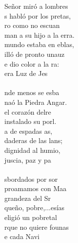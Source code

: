 \documentclass[12pt]{article}
\begin{document}
\begin{multicols*}{2}
\begin{cancion}%
	 Señor miró a lombres\\
	s habló por los pretas,\\
	ro como no escuan\\
	man a su hijo a la erra. \\
	 mundo estaba en eblas,\\
	illó de pronto unauz\\
	e dio color a la ra:\\
	era  Luz de Jes\\
	    \\
	nde menos se esba\\
	naó la Piedra Angar.\\
	 el corazón delre\\
	 instalado su porl.\\
	a de espadas as,\\
	daderas de las lans;\\
	 dignidad al humio,\\
	juscia, paz y pa\\
	   \\
	sbordados por sor\\
	proamamos con Maa \\
	 grandeza del Sr\\
	queño, pobre,...esías\\
	eligió un pobretal\\
	rque no quiere founas\\
	e cada Navi\\

\end{cancion}
\end{multicols*}
\end{document}

